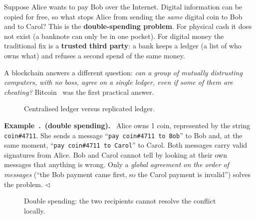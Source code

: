 \documentclass[11pt,a4paper]{article}
\newcounter{exn}[section]
\renewcommand{\theexn}{\thesection.\arabic{exn}}
\newenvironment{plainenglish}{\par\smallskip}{\par\smallskip}
\newenvironment{exbox}[1][]{\par\medskip\refstepcounter{exn}\noindent\textbf{Example~\theexn\if\relax\detokenize{#1}\relax\else\ (#1)\fi.}\ \ignorespaces}{\hfill$\triangleleft$\par\medskip}
\theoremstyle{definition}
\theoremstyle{plain}
\theoremstyle{remark}
\begin{document}
\begin{plainenglish}
Suppose Alice wants to pay Bob over the Internet. Digital information can be copied for free, so
what stops Alice from sending the \emph{same} digital coin to Bob and to Carol? This is the
\textbf{double-spending problem}. For physical cash it does not exist (a banknote can only be in one
pocket). For digital money the traditional fix is a \textbf{trusted third party}: a bank keeps a
ledger (a list of who owns what) and refuses a second spend of the same money.

A blockchain answers a different question: \emph{can a group of mutually distrusting computers, with
no boss, agree on a single ledger, even if some of them are cheating?} Bitcoin~\cite{Nak08} was the first practical answer.
\end{plainenglish}

\begin{figure}[htbp]
\centering
{}
\caption{Centralised ledger versus replicated ledger.}
\end{figure}

\begin{exbox}[double spending]
Alice owns 1 coin, represented by the string \texttt{coin\#4711}. She sends a message
``\texttt{pay coin\#4711 to Bob}'' to Bob and, at the same moment, ``\texttt{pay coin\#4711 to Carol}''
to Carol. Both messages carry valid signatures from Alice. Bob and Carol cannot tell by looking at
their own messages that anything is wrong. Only a \emph{global agreement on the order of messages}
(``the Bob payment came first, so the Carol payment is invalid'') solves the problem.
\end{exbox}

\begin{figure}[htbp]
\centering
{}
\caption{Double spending: the two recipients cannot resolve the conflict locally.}
\end{figure}
\end{document}
